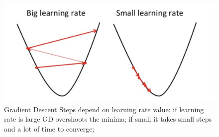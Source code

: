 \documentclass[journal]{IEEEtran}
\begin{document}
 \begin{figure}%
\centering
\includegraphics[width=.7\linewidth]{Figures/learning_rate}
\caption{Gradient Descent Steps depend on learning rate value:  if learning rate is large GD overshoots the minima; if small it takes small steps and a lot of time to converge;}
\label{lr}
\end{figure}
\end{document}
